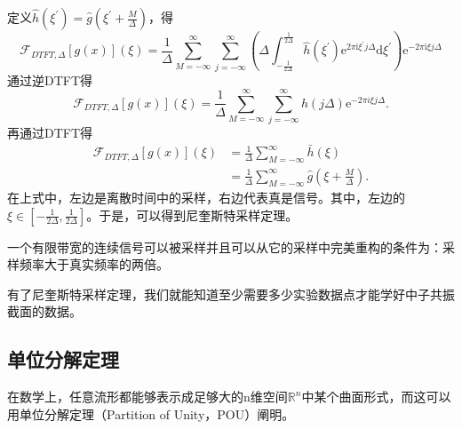 定义$\hat{h}\left(\xi^{\prime}\right)=\hat{g}\left(\xi^{\prime}+\frac{M}{\Delta}\right)$，得
\begin{equation}
\mathcal{F}_{D T F T, \Delta}[g(x)](\xi)=\frac{1}{\Delta} \sum_{M=-\infty}^{\infty} \sum_{j=-\infty}^{\infty}\left(\Delta \int_{-\frac{1}{2 \Delta}}^{\frac{1}{2 \Delta}} \hat{h}\left(\xi^{\prime}\right) \mathrm{e}^{2 \pi \mathrm{i} \xi^{\prime} j \Delta} \mathrm{d} \xi^{\prime}\right) \mathrm{e}^{-2 \pi \mathrm{i} \xi j \Delta}
\end{equation}
通过逆DTFT得
\begin{equation}
    \mathcal{F}_{DTFT,\Delta}[g(x)](\xi)=\dfrac{1}{\Delta}\sum\limits_{M=-\infty}^\infty\sum\limits_{j=-\infty}^\infty h(j\Delta)\mathrm{e}^{-2\pi i\xi j\Delta}.
\end{equation}
再通过DTFT得
\begin{equation}
    \begin{aligned}\mathcal{F}_{DTFT,\Delta}[g(x)](\xi)&=\frac{1}{\Delta}\sum_{M=-\infty}^\infty\bar{h}(\xi)\\ &=\frac{1}{\Delta}\sum_{M=-\infty}^\infty\hat{g}(\xi+\frac{M}{\Delta}).\end{aligned}
\end{equation}
在上式中，左边是离散时间中的采样，右边代表真是信号。其中，左边的$\xi \in [-\frac{1}{2\Delta },\frac{1}{2\Delta }  ]$。于是，可以得到尼奎斯特采样定理\cite{benedetto2001modern}。
\begin{thm}
一个有限带宽的连续信号可以被采样并且可以从它的采样中完美重构的条件为：采样频率大于真实频率的两倍。
\end{thm}
有了尼奎斯特采样定理，我们就能知道至少需要多少实验数据点才能学好中子共振截面的数据。

\subsection{单位分解定理}
在数学上，任意流形都能够表示成足够大的n维空间$\mathbb{R}^n$中某个曲面形式，而这可以用单位分解定理（Partition of Unity，POU）\cite{卓里奇2019数学分析}阐明。


